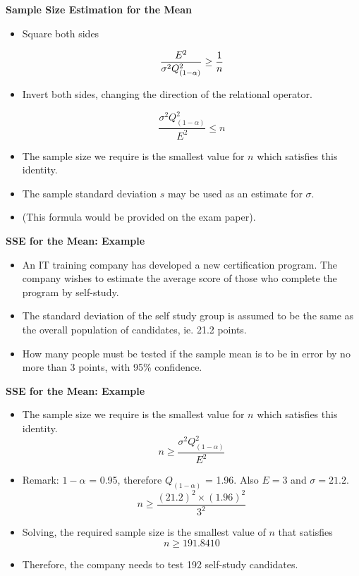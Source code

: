 \documentclass[]{report}
\begin{document}

\noindent \textbf{Sample Size Estimation for the Mean}

\begin{itemize}
\item Square both sides

\[ \frac{E^2}{\sigma^2 Q^2_{(1-\alpha)}} \geq {1 \over n } \]

\item Invert both sides, changing the direction of the relational operator.

\[ \frac{\sigma^2 Q^2_{(1-\alpha)}}{E^2} \leq n \]


\item The sample size we require is the smallest value for $n$ which satisfies this identity.
\item The sample standard deviation $s$ may be used as an estimate for $\sigma$.
\item (This formula would be provided on the exam paper).
\end{itemize}





\noindent \textbf{SSE for the Mean: Example}

\begin{itemize}
\item An IT training company has developed a new certification program. The company wishes to estimate the average score of those who complete the program by self-study.  \item The standard deviation of the self study group is assumed to be the same as the overall population of candidates, ie. 21.2 points.
\item How many people must be tested if the sample mean is to be in error by no more than 3 points, with 95\% confidence.
\end{itemize}


\noindent \textbf{SSE for the Mean: Example}

\begin{itemize}
\item The sample size we require is the smallest value for $n$ which satisfies this identity.
\[ n \geq \frac{\sigma^2 Q^2_{(1-\alpha)}}{E^2}  \]
\item Remark: $1-\alpha$ = 0.95, therefore $Q_{(1-\alpha)}$ = 1.96. Also $E=3$ and $\sigma =21.2$.
\[ n \geq \frac{(21.2)^2 \times (1.96)^2}{3^2} \]
\item Solving, the required sample size is the smallest value of $n$ that satisfies
\[ n \geq 191.8410 \]
\item Therefore, the company needs to test 192 self-study candidates.
\end{itemize}
\end{document}
